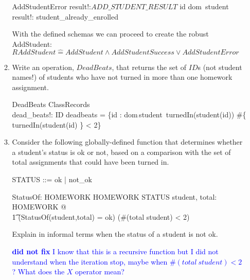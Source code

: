 \documentclass{article}
\newcommand{\estimates}{\mathrel{\hat{=}}}
\begin{document}
\begin{enumerate}
\begin{enumerate}
\begin{schema}{AddStudentError}
    result!:$ADD\_STUDENT\_RESULT$ 
    \where
    id \in dom\, student \\ 
    result!: student\_already\_enrolled
\end{schema}

With the defined schemas we can proceed to create the robust AddStudent: \\
$RAddStudent \estimates AddStudent \land AddStudentSuccess \lor AddStudentError$ \\

\color{black}
\item Write an operation, $DeadBeats$, that returns the set of $ID$s
(not student names!) of students who have not turned in more than one homework assignment.
  \color{blue}
\begin{schema}{DeadBeats}
  \Xi ClassRecords \\
  dead\_beats!:  ID
  \where
     deadbeats = \{id : dom\,student\, \vert \neg turnedIn(student(id)) \land \#\{ turnedIn(student(id) \} < 2\}
\end{schema}
\color{black}

\item Consider the following globally-defined function that
determines whether a student's status is ok or not, based on a
comparison with the set of total assignments that could have been
turned in.

\begin{zed}
    STATUS ::= ok | not\_ok
\end{zed}

\begin{axdef}
    StatusOf: \power HOMEWORK \cross \power HOMEWORK \fun STATUS
\where
    \forall student, total: \power HOMEWORK @ \\
\t1    (StatusOf(student,total) = ok) \iff (\#(total \setminus
student) < 2)
\end{axdef}

Explain in informal terms when the status of a student is not ok.

\textcolor{blue}{
  \textbf{did not fix}
  I know that this is a recursive function but I did not understand when the
  iteration stop, maybe when $\#(total \ student ) < 2$ ?
  What does the $X$ operator mean? 
}

\end{enumerate}


\end{enumerate}
\end{document}
